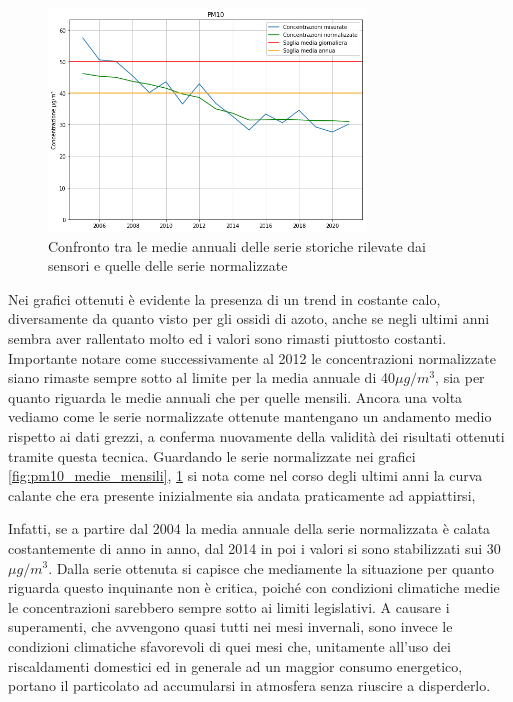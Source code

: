\begin{figure}[h]
\centering
\includegraphics[width=0.75\textwidth]{pm10_medie_annuali}
\caption{Confronto tra le medie annuali delle serie storiche rilevate dai sensori e quelle delle serie normalizzate}
\label{fig:pm10_medie_annuali}
\end{figure}

Nei grafici ottenuti è evidente la presenza di un trend in costante calo, diversamente da quanto visto per gli ossidi di azoto, anche se negli ultimi anni sembra aver rallentato molto ed i valori sono rimasti piuttosto costanti.
Importante notare come successivamente al 2012 le concentrazioni normalizzate siano rimaste sempre sotto al limite per la media annuale di 40$\mu g/m^3$, sia per quanto riguarda le medie annuali che per quelle mensili.
Ancora una volta vediamo come le serie normalizzate ottenute mantengano un andamento medio rispetto ai dati grezzi, a conferma nuovamente della validità dei risultati ottenuti tramite questa tecnica.
Guardando le serie normalizzate nei grafici \ref{fig:pm10_medie_mensili}, \ref{fig:pm10_medie_annuali} si nota come nel corso degli ultimi anni la curva calante che era presente inizialmente sia andata praticamente ad appiattirsi,

Infatti, se a partire dal 2004 la media annuale della serie normalizzata è calata costantemente di anno in anno, dal 2014 in poi i valori si sono stabilizzati sui 30$\mu g/m^3$. Dalla serie ottenuta si capisce che mediamente la situazione per quanto riguarda questo inquinante non è critica, poiché con condizioni climatiche medie le concentrazioni sarebbero sempre sotto ai limiti legislativi. A causare i superamenti, che avvengono quasi tutti nei mesi invernali, sono invece le condizioni climatiche sfavorevoli di quei mesi che, unitamente all'uso dei riscaldamenti domestici ed in generale ad un maggior consumo energetico, portano il particolato ad accumularsi in atmosfera senza riuscire a disperderlo.

